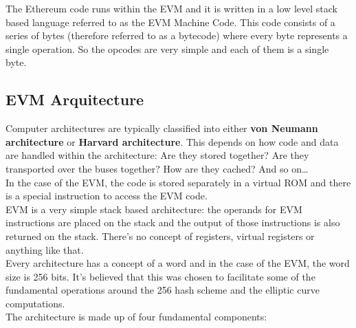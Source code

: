 The Ethereum code runs within the EVM and it is written in a low level stack based language referred to as the EVM Machine Code.
This code consists of a series of bytes (therefore referred to as a bytecode) where every byte represents a single operation.
So the opcodes are very simple and each of them is a single byte.

\subsection*{EVM Arquitecture}

Computer architectures are typically classified into either \textbf{von Neumann architecture} or \textbf{Harvard architecture}.
This depends on how code and data are handled within the architecture: Are they stored together? Are they transported over the buses together? How are they cached? And so on\dots\\

In the case of the EVM, the code is stored separately in a virtual ROM and there is a special instruction to access the EVM code.\\

EVM is a very simple stack based architecture: the operands for EVM instructions are placed on the stack and the output of those instructions is also returned on the stack.
There's no concept of registers, virtual registers or anything like that.\\

Every architecture has a concept of a word and in the case of the EVM, the word size is 256 bits.
It's believed that this was chosen to facilitate some of the fundamental operations around the 256 hash scheme and the elliptic curve computations.\\

The architecture is made up of four fundamental components:

